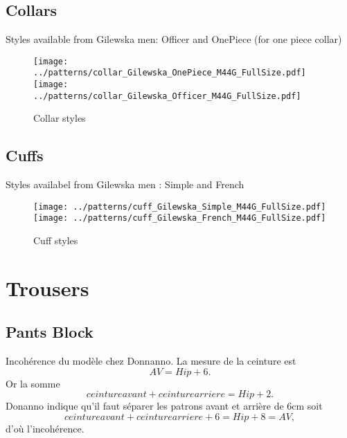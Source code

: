 \documentclass[11pt,a4paper]{report}
\begin{document}
\section{Collars}
Styles available from Gilewska men: Officer and OnePiece (for one piece collar)

\begin{figure}
\begin{center}
\texttt{[image: ../patterns/collar\_Gilewska\_OnePiece\_M44G\_FullSize.pdf]}
\texttt{[image: ../patterns/collar\_Gilewska\_Officer\_M44G\_FullSize.pdf]}
\end{center}
\caption{Collar styles}
\end{figure}


\section{Cuffs}
Styles availabel from Gilewska men : Simple and French

\begin{figure}
\begin{center}
\texttt{[image: ../patterns/cuff\_Gilewska\_Simple\_M44G\_FullSize.pdf]}
\texttt{[image: ../patterns/cuff\_Gilewska\_French\_M44G\_FullSize.pdf]}
\end{center}
\caption{Cuff styles}
\end{figure}

\chapter{Trousers}


\section{Pants Block}

Incohérence du modèle chez Donnanno. La mesure de la ceinture est
$$AV = Hip + 6.$$
Or la somme
$$ceinture avant + ceinture arriere = Hip +2.$$
Donanno indique qu'il faut séparer les patrons avant et arrière de 6cm soit
$$ceinture avant + ceinture arriere + 6 = Hip +8 = AV,$$
d'où l'incohérence.




\end{document}
